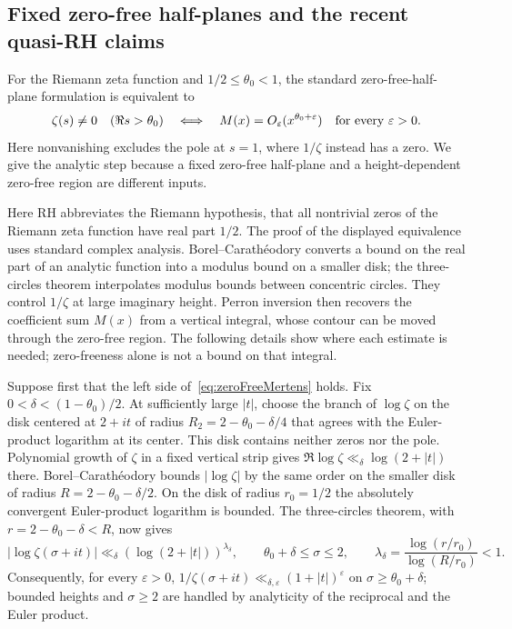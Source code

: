 \subsection{Fixed zero-free half-planes and the recent quasi-RH claims}
\label{subsec:quasiRHapplication}

For the Riemann zeta function and $1/2\le\theta_0<1$, the standard
zero-free-half-plane formulation is equivalent to
\begin{equation}
 \zeta(s)\ne0\quad(\Re s>\theta_0)
 \quad\Longleftrightarrow\quad
 M(x)=O_\varepsilon(x^{\theta_0+\varepsilon})
 \quad\hbox{for every }\varepsilon>0.
 \label{eq:zeroFreeMertens}
\end{equation}
Here nonvanishing excludes the pole at $s=1$, where $1/\zeta$
instead has a zero. We give the analytic step because a fixed zero-free
half-plane and a height-dependent zero-free region are different inputs.

Here RH abbreviates the Riemann hypothesis, that all nontrivial
zeros of the Riemann zeta function have real part $1/2$.
The proof of the displayed equivalence uses standard complex
analysis. Borel--Carath\'eodory converts a bound on the real part
of an analytic function into a modulus bound on a smaller disk;
the three-circles theorem interpolates modulus bounds between
concentric circles. They control $1/\zeta$ at large imaginary
height. Perron inversion then recovers the coefficient sum $M(x)$
from a vertical integral, whose contour can be moved through the
zero-free region. The following details show where each estimate
is needed; zero-freeness alone is not a bound on that integral.

Suppose first that the left side of~\eqref{eq:zeroFreeMertens} holds.
Fix $0<\delta<(1-\theta_0)/2$. At sufficiently large $|t|$, choose the
branch of $\log\zeta$ on the disk centered at $2+it$ of radius
$R_2=2-\theta_0-\delta/4$ that agrees with the Euler-product logarithm
at its center. This disk contains neither zeros nor the pole.
Polynomial growth of $\zeta$ in a fixed vertical strip gives
$\Re\log\zeta\ll_\delta\log(2+|t|)$ there.
Borel--Carath\'eodory bounds $|\log\zeta|$ by the same order on the
smaller disk of radius $R=2-\theta_0-\delta/2$. On the disk of radius
$r_0=1/2$ the absolutely convergent Euler-product logarithm is bounded.
The three-circles theorem, with $r=2-\theta_0-\delta<R$, now gives
\[
 |\log\zeta(\sigma+it)|\ll_\delta(\log(2+|t|))^{\lambda_\delta},
 \qquad \theta_0+\delta\le\sigma\le2,\qquad
 \lambda_\delta=\frac{\log(r/r_0)}{\log(R/r_0)}<1.
\]
Consequently, for every $\varepsilon>0$,
$1/\zeta(\sigma+it)\ll_{\delta,\varepsilon}(1+|t|)^\varepsilon$
on $\sigma\ge\theta_0+\delta$; bounded heights and $\sigma\ge2$
are handled by analyticity of the reciprocal and the Euler product.

